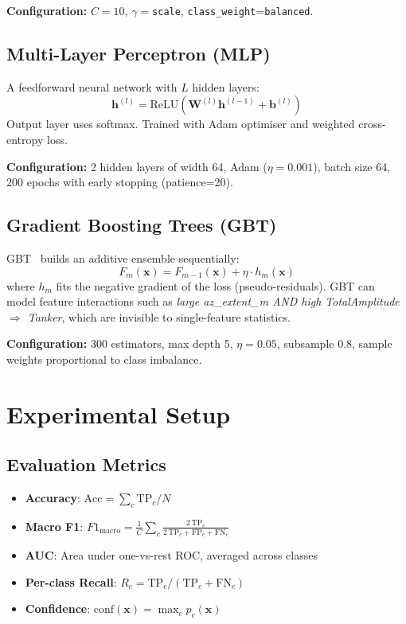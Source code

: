 \documentclass[journal]{IEEEtran}
\newcommand{\vect}[1]{\boldsymbol{#1}}
\newcommand{\mat}[1]{\mathbf{#1}}
\begin{document}
\textbf{Configuration:} $C=10$, $\gamma=$\texttt{scale},
\texttt{class\_weight}=\texttt{balanced}.

\subsection{Multi-Layer Perceptron (MLP)}

A feedforward neural network with $L$ hidden layers:
\begin{equation}
  \vect{h}^{(l)} = \text{ReLU}\!\left(\mat{W}^{(l)}\vect{h}^{(l-1)} + \vect{b}^{(l)}\right)
\end{equation}
Output layer uses softmax. Trained with Adam optimiser and weighted
cross-entropy loss.

\textbf{Configuration:} 2 hidden layers of width 64, Adam ($\eta=0.001$),
batch size 64, 200 epochs with early stopping (patience=20).

\subsection{Gradient Boosting Trees (GBT)}

GBT~\cite{friedman2001greedy} builds an additive ensemble sequentially:
\begin{equation}
  F_m(\vect{x}) = F_{m-1}(\vect{x}) + \eta \cdot h_m(\vect{x})
\end{equation}
where $h_m$ fits the negative gradient of the loss (pseudo-residuals).
GBT can model feature interactions such as
\textit{large az\_extent\_m AND high TotalAmplitude $\Rightarrow$ Tanker},
which are invisible to single-feature statistics.

\textbf{Configuration:} 300 estimators, max depth 5, $\eta=0.05$,
subsample 0.8, sample weights proportional to class imbalance.

\section{Experimental Setup}
\label{sec:setup}

\subsection{Evaluation Metrics}

\begin{itemize}
  \item \textbf{Accuracy}: $\text{Acc} = \sum_c \text{TP}_c / N$
  \item \textbf{Macro F1}: $F1_{\text{macro}} = \frac{1}{C}\sum_c \frac{2\,\text{TP}_c}{2\,\text{TP}_c + \text{FP}_c + \text{FN}_c}$
  \item \textbf{AUC}: Area under one-vs-rest ROC, averaged across classes
  \item \textbf{Per-class Recall}: $R_c = \text{TP}_c / (\text{TP}_c + \text{FN}_c)$
  \item \textbf{Confidence}: $\text{conf}(\vect{x}) = \max_c p_c(\vect{x})$
\end{itemize}
\end{document}
